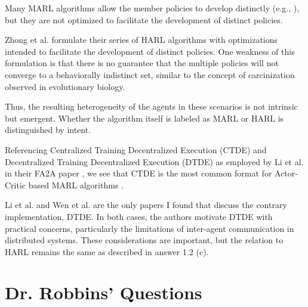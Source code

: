 \documentclass[12pt,letterpaper]{exam}
\begin{document}
\begin{questions}
\begin{parts}
		Many MARL algorithms allow the member policies to develop distinctly 
		(e.g., \cite{foerster2017, rashid2018, lowe2020}), but they are 
		not optimized to facilitate the development of distinct policies.

		Zhong et al. \cite{zhong2024} formulate their series of HARL 
		algorithms with optimizations intended to facilitate the development 
		of distinct policies. One weakness of this formulation is that there 
		is no guarantee that the multiple policies will not converge to a 
		behaviorally indistinct set, similar to the concept of 
		carcinization observed in evolutionary biology.

		Thus, the resulting heterogeneity of the agents in these scenarios 
		is not intrinsic but emergent. Whether the algorithm itself is 
		labeled as MARL or HARL is distinguished by intent.
	\end{parts}

	\question
	Referencing Centralized Training Decentralized Execution (CTDE) 
	and Decentralized Training Decentralized Execution (DTDE) as employed 
	by Li et al. in their FA2A paper \cite{li2023d}, we see that CTDE is 
	the most common format for Actor-Critic based MARL algorithms 
	\cite{foerster2017, rashid2018, lowe2020, li2023d, zhou2023}.

	Li et al. \cite{li2023d} and Wen et al. \cite{wen2021} are the only 
	papers I found that discuss the contrary implementation, DTDE. 
	In both cases, the authors motivate DTDE with practical concerns, 
	particularly the limitations of inter-agent communication in 
	distributed systems. These considerations are important, but the 
	relation to HARL remains the same as described in answer 1.2 (c).
\end{questions}






\section{Dr. Robbins' Questions}


\begin{questions}
\setcounter{question}{0}
	\question
\end{questions}
\end{document}
